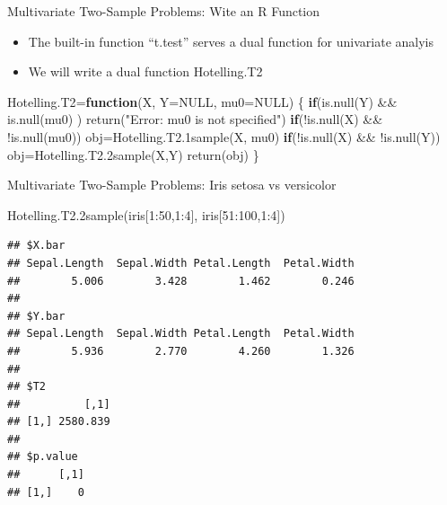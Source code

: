 \documentclass[
  ignorenonframetext,
]{beamer}
\newenvironment{Shaded}{\begin{snugshade}}{\end{snugshade}}
\newcommand{\AttributeTok}[1]{\textcolor[rgb]{0.77,0.63,0.00}{#1}}
\newcommand{\ConstantTok}[1]{\textcolor[rgb]{0.00,0.00,0.00}{#1}}
\newcommand{\ControlFlowTok}[1]{\textcolor[rgb]{0.13,0.29,0.53}{\textbf{#1}}}
\newcommand{\DecValTok}[1]{\textcolor[rgb]{0.00,0.00,0.81}{#1}}
\newcommand{\FunctionTok}[1]{\textcolor[rgb]{0.00,0.00,0.00}{#1}}
\newcommand{\NormalTok}[1]{#1}
\newcommand{\OtherTok}[1]{\textcolor[rgb]{0.56,0.35,0.01}{#1}}
\newcommand{\SpecialCharTok}[1]{\textcolor[rgb]{0.00,0.00,0.00}{#1}}
\newcommand{\StringTok}[1]{\textcolor[rgb]{0.31,0.60,0.02}{#1}}
\providecommand{\tightlist}{%
  \setlength{\itemsep}{0pt}\setlength{\parskip}{0pt}}
\begin{document}
\begin{frame}[fragile]{Multivariate Two-Sample Problems: Wite an R
Function}
\protect\hypertarget{multivariate-two-sample-problems-wite-an-r-function}{}
\begin{itemize}
\tightlist
\item
  The built-in function ``t.test'' serves a dual function for univariate
  analyis
\item
  We will write a dual function Hotelling.T2
\end{itemize}

\begin{Shaded}
\begin{Highlighting}[]
\NormalTok{Hotelling.T2}\OtherTok{=}\ControlFlowTok{function}\NormalTok{(X, }\AttributeTok{Y=}\ConstantTok{NULL}\NormalTok{, }\AttributeTok{mu0=}\ConstantTok{NULL}\NormalTok{)}
\NormalTok{\{}
 \ControlFlowTok{if}\NormalTok{(}\FunctionTok{is.null}\NormalTok{(Y) }\SpecialCharTok{\&\&} \FunctionTok{is.null}\NormalTok{(mu0) ) }
   \FunctionTok{return}\NormalTok{(}\StringTok{"Error: mu0 is not specified"}\NormalTok{)}
 \ControlFlowTok{if}\NormalTok{(}\SpecialCharTok{!}\FunctionTok{is.null}\NormalTok{(X) }\SpecialCharTok{\&\&} \SpecialCharTok{!}\FunctionTok{is.null}\NormalTok{(mu0)) }
\NormalTok{   obj}\OtherTok{=}\FunctionTok{Hotelling.T2.1sample}\NormalTok{(X, mu0) }
 \ControlFlowTok{if}\NormalTok{(}\SpecialCharTok{!}\FunctionTok{is.null}\NormalTok{(X) }\SpecialCharTok{\&\&} \SpecialCharTok{!}\FunctionTok{is.null}\NormalTok{(Y)) }
\NormalTok{   obj}\OtherTok{=}\FunctionTok{Hotelling.T2.2sample}\NormalTok{(X,Y)}
 \FunctionTok{return}\NormalTok{(obj)}
\NormalTok{\} }
\end{Highlighting}
\end{Shaded}
\end{frame}

\begin{frame}[fragile]{Multivariate Two-Sample Problems: Iris setosa vs
versicolor}
\protect\hypertarget{multivariate-two-sample-problems-iris-setosa-vs-versicolor}{}
\tiny

\begin{Shaded}
\begin{Highlighting}[]
\FunctionTok{Hotelling.T2.2sample}\NormalTok{(iris[}\DecValTok{1}\SpecialCharTok{:}\DecValTok{50}\NormalTok{,}\DecValTok{1}\SpecialCharTok{:}\DecValTok{4}\NormalTok{], iris[}\DecValTok{51}\SpecialCharTok{:}\DecValTok{100}\NormalTok{,}\DecValTok{1}\SpecialCharTok{:}\DecValTok{4}\NormalTok{])}
\end{Highlighting}
\end{Shaded}

\begin{verbatim}
## $X.bar
## Sepal.Length  Sepal.Width Petal.Length  Petal.Width 
##        5.006        3.428        1.462        0.246 
## 
## $Y.bar
## Sepal.Length  Sepal.Width Petal.Length  Petal.Width 
##        5.936        2.770        4.260        1.326 
## 
## $T2
##          [,1]
## [1,] 2580.839
## 
## $p.value
##      [,1]
## [1,]    0
\end{verbatim}

\normalsize
\end{frame}
\end{document}
